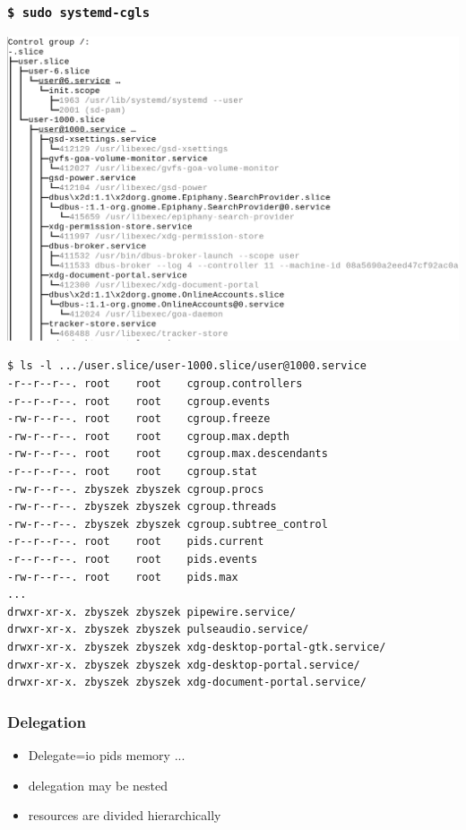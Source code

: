\documentclass[serif]{beamer}
\begin{document}
\begin{frame}[fragile]
  \tiny
  \frametitle{\texttt{\$ sudo systemd-cgls}}
  \includegraphics[width=\textwidth]{images/delegation-cgls.png}
\end{frame}

\begin{frame}[fragile]
  \begin{verbatim}
$ ls -l .../user.slice/user-1000.slice/user@1000.service
-r--r--r--. root    root    cgroup.controllers
-r--r--r--. root    root    cgroup.events
-rw-r--r--. root    root    cgroup.freeze
-rw-r--r--. root    root    cgroup.max.depth
-rw-r--r--. root    root    cgroup.max.descendants
-r--r--r--. root    root    cgroup.stat
-rw-r--r--. zbyszek zbyszek cgroup.procs
-rw-r--r--. zbyszek zbyszek cgroup.threads
-rw-r--r--. zbyszek zbyszek cgroup.subtree_control
-r--r--r--. root    root    pids.current
-r--r--r--. root    root    pids.events
-rw-r--r--. root    root    pids.max
...
drwxr-xr-x. zbyszek zbyszek pipewire.service/
drwxr-xr-x. zbyszek zbyszek pulseaudio.service/
drwxr-xr-x. zbyszek zbyszek xdg-desktop-portal-gtk.service/
drwxr-xr-x. zbyszek zbyszek xdg-desktop-portal.service/
drwxr-xr-x. zbyszek zbyszek xdg-document-portal.service/
  \end{verbatim}
\end{frame}

\begin{frame}
  \frametitle{Delegation}

  \begin{itemize}
  \item Delegate=io pids memory ...
  \item delegation may be nested
  \item resources are divided hierarchically
  \end{itemize}
\end{frame}
\end{document}
